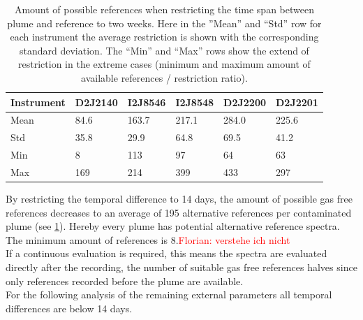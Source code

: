 \begin{table}[h]
	\centering
	\begin{tabular}{p{1.8cm}|p{2.15cm}p{2.15cm}p{2.15cm}p{2.15cm}p{2.15cm}|}
		Instrument	&D2J2140&I2J8546& I2J8548&D2J2200&D2J2201\\
		\toprule
		Mean&84.6 &163.7 &217.1&284.0 &225.6 \\
		\midrule
		Std&
		35.8&%
		29.9&%
		64.8&%
		69.5&%
		41.2\\%
		\midrule
		Min&
		8 &%
		113&%
		97 &%
		64&%
		63\\%
		\midrule
		Max&
		169&%
		214&%
		399&%
		433&%
		297\\%
		\bottomrule
	\end{tabular}
	\caption{Amount of possible references when restricting the time span between plume and reference to two weeks. Here in the ”Mean” and “Std” row for each  instrument the average restriction is shown with the corresponding standard deviation. The “Min” and “Max” rows show the extend of restriction in the extreme cases (minimum and maximum amount of available references / restriction ratio).}
	\label{Tab:refstime}
\end{table}	
By restricting the temporal difference to 14 days, the amount of possible gas free references decreases to an average of 195 alternative references per contaminated plume (see \cref{Tab:refstime}). Hereby every plume has potential alternative reference spectra. The minimum amount of references is 8.\textcolor{red}{Florian: verstehe ich nicht}\\
If a continuous evaluation is required, this means the spectra are evaluated directly after the recording, the number of suitable gas free references halves since only references recorded before the plume are available.\\
\nopagebreak
For the following analysis of the remaining external parameters all temporal differences are below 14 days.
